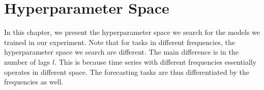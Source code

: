 \chapter{Hyperparameter Space}\label{apdx: hyper space}
In this chapter, we present the hyperparameter space we search for the models we trained in our experiment. Note that for tasks in different frequencies, the hyperparameter space we search are different. The main difference is in the number of lags $l$. This is because time series with different frequencies essentially operates in different space. The forecasting tasks are thus differentiated by the frequencies as well.

\begin{center}
    \begin{table}[h!]
\end{table}
\end{center}
